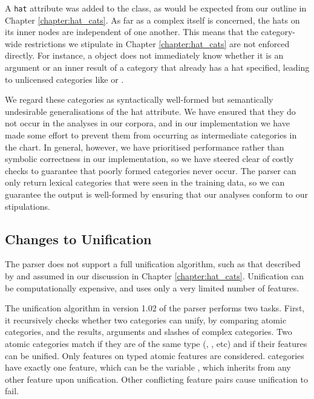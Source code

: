 A \texttt{hat} attribute was added to the  class, as would be
expected from our outline in Chapter \ref{chapter:hat_cats}. As far as a complex
 itself is concerned, the hats on its inner 
nodes are independent of one another. This means that the category-wide
restrictions we stipulate in Chapter \ref{chapter:hat_cats} are not enforced
directly. For instance, a  object does not immediately know
whether it is an argument or an inner result of a category that already has a
hat specified, leading to unlicensed categories like  or
.

We regard these categories as syntactically well-formed but semantically
undesirable generalisations of the hat attribute. We have ensured that they do
not occur in the analyses in our corpora, and in our implementation we have made
some effort to prevent them from occurring as intermediate categories in the
chart. In general, however, we have prioritised performance rather than symbolic
correctness in our implementation, so we have steered clear of costly checks to
guarantee that poorly formed categories never occur. The parser can only return
lexical categories that were seen in the training data, so we can guarantee the
output is well-formed by ensuring that our analyses conform to our stipulations.

\subsection{Changes to Unification}

The \candc parser does not support a full unification algorithm, such as that
described by \citet{shieber:86} and assumed in our discussion in Chapter
\ref{chapter:hat_cats}. Unification can be computationally expensive, and
\ccgbank uses only a very limited number of features.

The unification algorithm in version 1.02 of the parser performs two tasks.
First, it recursively checks whether two categories can unify, by comparing
atomic categories, and the results, arguments and slashes of complex categories.
Two atomic categories match if they are of the same type (, ,
 etc) and if their features can be unified. Only features on  typed
atomic features are considered.  categories have exactly one feature,
which can be the variable , which inherits from any other feature upon
unification. Other conflicting feature pairs cause unification to fail.

